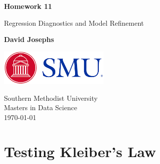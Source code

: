 \documentclass[english]{article}\usepackage[]{graphicx}\usepackage[]{color}
\begin{document}
	

\begin{titlepage}
	\pagecolor{white}
	\begin{center}
		\vspace*{1cm}
		
		\Huge
		\textbf{Homework 11}
		
		\vspace{0.5cm}
		\LARGE
Regression Diagnostics and Model Refinement

		
		\vspace{1.5cm}
		
		\textbf{David Josephs}
		
		\vspace{1.5cm}
		\includegraphics[width=0.4\textwidth]{Logo}
		
		
		\vspace{0.8cm}
		
		
		
		\Large
		Southern Methodist University\\
		Masters in Data Science\\
		\today
		
	\end{center}
\end{titlepage}
\tableofcontents
\setcounter{tocdepth}{2}
\setcounter{secnumdepth}{3}
\listofCode
\listoffigures
\pagebreak
\section{Testing Kleiber's Law}
\end{document}
